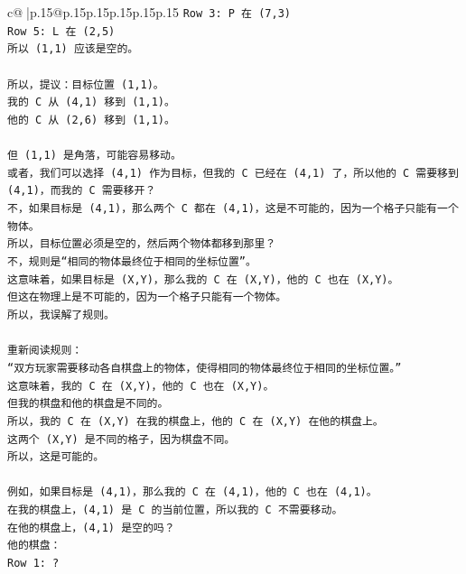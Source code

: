 \documentclass{article}
\begin{document}
{\begin{supertabular}{c@{$\;$}|p{.15\linewidth}@{}p{.15\linewidth}p{.15\linewidth}p{.15\linewidth}p{.15\linewidth}p{.15\linewidth}}
{{{\texttt{Row 3: P 在 (7,3)} \\
\texttt{Row 5: L 在 (2,5)} \\
\texttt{所以 (1,1) 应该是空的。} \\
\\ 
\texttt{所以，提议：目标位置 (1,1)。} \\
\texttt{我的 C 从 (4,1) 移到 (1,1)。} \\
\texttt{他的 C 从 (2,6) 移到 (1,1)。} \\
\\ 
\texttt{但 (1,1) 是角落，可能容易移动。} \\
\texttt{或者，我们可以选择 (4,1) 作为目标，但我的 C 已经在 (4,1) 了，所以他的 C 需要移到 (4,1)，而我的 C 需要移开？} \\
\texttt{不，如果目标是 (4,1)，那么两个 C 都在 (4,1)，这是不可能的，因为一个格子只能有一个物体。} \\
\texttt{所以，目标位置必须是空的，然后两个物体都移到那里？} \\
\texttt{不，规则是“相同的物体最终位于相同的坐标位置”。} \\
\texttt{这意味着，如果目标是 (X,Y)，那么我的 C 在 (X,Y)，他的 C 也在 (X,Y)。} \\
\texttt{但这在物理上是不可能的，因为一个格子只能有一个物体。} \\
\texttt{所以，我误解了规则。} \\
\\ 
\texttt{重新阅读规则：} \\
\texttt{“双方玩家需要移动各自棋盘上的物体，使得相同的物体最终位于相同的坐标位置。”} \\
\texttt{这意味着，我的 C 在 (X,Y)，他的 C 也在 (X,Y)。} \\
\texttt{但我的棋盘和他的棋盘是不同的。} \\
\texttt{所以，我的 C 在 (X,Y) 在我的棋盘上，他的 C 在 (X,Y) 在他的棋盘上。} \\
\texttt{这两个 (X,Y) 是不同的格子，因为棋盘不同。} \\
\texttt{所以，这是可能的。} \\
\\ 
\texttt{例如，如果目标是 (4,1)，那么我的 C 在 (4,1)，他的 C 也在 (4,1)。} \\
\texttt{在我的棋盘上，(4,1) 是 C 的当前位置，所以我的 C 不需要移动。} \\
\texttt{在他的棋盘上，(4,1) 是空的吗？} \\
\texttt{他的棋盘：} \\
\texttt{Row 1: ?} \\
}}}
\end{supertabular}}
\end{document}
